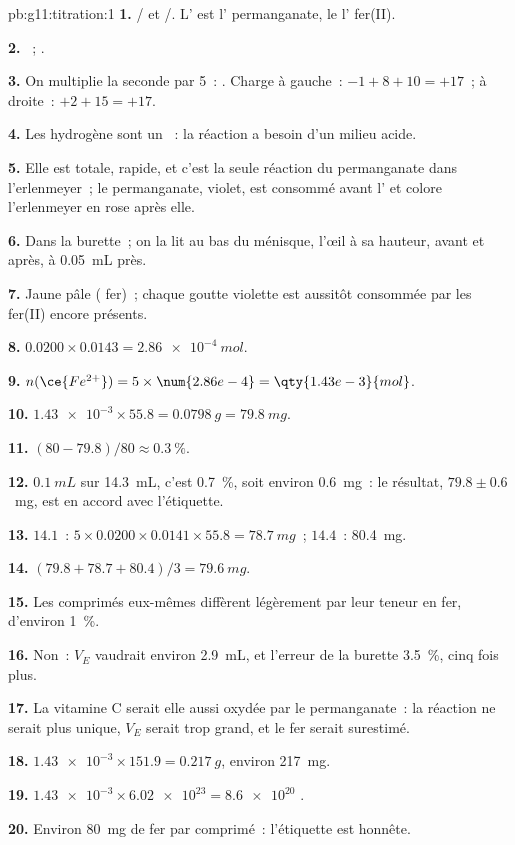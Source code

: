 \begin{solution}{pb:g11:titration:1}
\textbf{1.} / et /.
L' est l' permanganate, le  l' fer(II).

\textbf{2.} ~;
.

\textbf{3.} On multiplie la seconde par 5~:
. Charge à
gauche~: $-1 + 8 + 10 = +17$~; à droite~: $+2 + 15 = +17$.

\textbf{4.} Les  hydrogène sont un ~: la réaction a besoin
d'un milieu acide.

\textbf{5.} Elle est totale, rapide, et c'est la seule réaction du
permanganate dans l'erlenmeyer~; le permanganate, violet, est consommé
avant l' et colore l'erlenmeyer en rose après elle.

\textbf{6.} Dans la burette~; on la lit au bas du ménisque, l'œil à sa
hauteur, avant et après, à \qty{0.05}{mL} près.

\textbf{7.} Jaune pâle ( fer)~; chaque goutte violette est aussitôt
consommée par les  fer(II) encore présents.

\textbf{8.} $0.0200 \times 0.0143 = \qty{2.86e-4}{mol}$.

\textbf{9.} $n(\ce{Fe^{2+}}) = 5 \times \num{2.86e-4} =
\qty{1.43e-3}{mol}$.

\textbf{10.} $\num{1.43e-3} \times 55.8 = \qty{0.0798}{g} =
\qty{79.8}{mg}$.

\textbf{11.} $(80 - 79.8)/80 \approx \qty{0.3}{\percent}$.

\textbf{12.} $\qty{0.1}{mL}$ sur \qty{14.3}{mL}, c'est \qty{0.7}{\percent},
soit environ \qty{0.6}{mg}~: le résultat, $79.8 \pm 0.6$~mg, est en
accord avec l'étiquette.

\textbf{13.} $14.1$~: $5 \times 0.0200 \times 0.0141 \times 55.8 =
\qty{78.7}{mg}$~; $14.4$~: \qty{80.4}{mg}.

\textbf{14.} $(79.8 + 78.7 + 80.4)/3 = \qty{79.6}{mg}$.

\textbf{15.} Les comprimés eux-mêmes diffèrent légèrement par leur
teneur en fer, d'environ \qty{1}{\percent}.

\textbf{16.} Non~: $V_E$ vaudrait environ \qty{2.9}{mL}, et l'erreur de
la burette \qty{3.5}{\percent}, cinq fois plus.

\textbf{17.} La vitamine C serait elle aussi oxydée par le
permanganate~: la réaction ne serait plus unique, $V_E$ serait trop
grand, et le fer serait surestimé.

\textbf{18.} $\num{1.43e-3} \times 151.9 = \qty{0.217}{g}$, environ
\qty{217}{mg}.

\textbf{19.} $\num{1.43e-3} \times \num{6.02e23} = \num{8.6e20}$ .

\textbf{20.} Environ \qty{80}{mg} de fer par comprimé~: l'étiquette est
honnête.
\end{solution}

